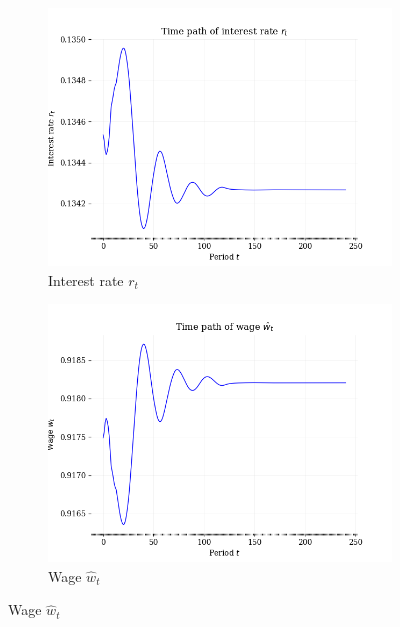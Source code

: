 \documentclass[letterpaper,12pt]{article}
\theoremstyle{definition}
\begin{document}
    \begin{figure}[htbp]\centering \captionsetup{width=5.0in}
    \caption{\label{FigTPrwBQ}\textbf{Equilibrium transition paths of prices and total bequests}}
      \begin{subfigure}[b]{0.4\textwidth}
        \includegraphics[width=\textwidth]{images/TP_r_path.png}
        \caption{Interest rate $r_t$}
        \label{FigTPrwBQ_r}
      \end{subfigure}
      \begin{subfigure}[b]{0.4\textwidth}
        \includegraphics[width=\textwidth]{images/TP_w_path.png}
        \caption{Wage $\hat{w}_t$}
        \label{FigTPrwBQ_w}
      \end{subfigure}

\end{figure}
\end{document}
